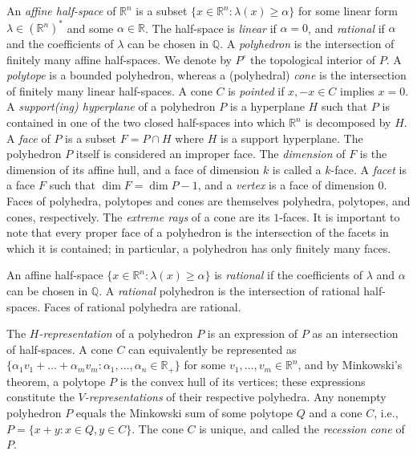 \documentclass[12pt]{amsart}
\theoremstyle{definition}
\numberwithin{equation}{section}
\newcommand{\ring}[1]{\ensuremath{\mathbb{#1}}}
\renewcommand\>{\rangle}
\newcommand\<{\langle}
\newcommand\0{\mathbf{0}}
\newcommand\QQ{\ring{Q}}
\newcommand\RR{\ring{R}}
\begin{document}
An \emph{affine half-space} of $\RR^n$ is a subset $\{x \in \RR^n: \lambda(x) \ge \alpha\}$ for some linear form $\lambda\in(\RR^n)^*$ and some $\alpha \in\RR$.  The half-space is \emph{linear} if $\alpha = 0$, and \emph{rational} if $\alpha$ and the coefficients of $\lambda$ can be chosen in $\QQ$.  A \emph{polyhedron} is the intersection of finitely many affine half-spaces.  We denote by $P^\circ$ the topological interior of $P$.  A \emph{polytope} is a bounded polyhedron, whereas a (polyhedral) \emph{cone} is the intersection of finitely many linear half-spaces. A cone $C$ is \emph{pointed} if $x,-x\in C$ implies $x = 0$. A \emph{support(ing) hyperplane} of a polyhedron $P$ is a hyperplane $H$ such that $P$ is contained in one of the two closed half-spaces into which $\RR^n$ is decomposed by $H$.  A \emph{face} of $P$ is a subset $F = P\cap H$ where $H$ is a support hyperplane.  The polyhedron $P$ itself is considered an improper face.  The \emph{dimension} of $F$ is the dimension of its affine hull, and a face of dimension $k$ is called a $k$-face. A \emph{facet} is a face $F$ such that $\dim F=\dim P-1$, and a \emph{vertex} is a face of dimension $0$. Faces of polyhedra, polytopes and cones are themselves polyhedra, polytopes, and cones, respectively. The \emph{extreme rays} of a cone are its $1$-faces. It is important to note that every proper face of a polyhedron is the intersection of the facets in which it is contained; in particular, a polyhedron has only finitely many faces.

An affine half-space $\{x \in \RR^n : \lambda(x) \ge \alpha\}$ is \emph{rational} if the coefficients of $\lambda$ and $\alpha$ can be chosen in $\QQ$. A \emph{rational} polyhedron is the intersection of rational half-spaces. Faces of rational polyhedra are rational.

The \emph{$H$-representation} of a polyhedron $P$ is an expression of $P$ as an intersection of half-spaces.  A cone $C$ can equivalently be represented as $\{\alpha_1v_1+\dots+\alpha_mv_m: \alpha_1,\dots,\alpha_n\in\RR_+ \}$ for some $v_1,\dots,v_m\in\RR^n$, and by Minkowski's theorem, a polytope $P$ is the convex hull of its vertices; these expressions constitute the \emph{$V$-representations} of their respective polyhedra.  Any nonempty polyhedron $P$ equals the Minkowski sum of some polytope $Q$ and a cone $C$, i.e., $P = \{x + y : x \in Q, y \in C\}$.  The cone $C$ is unique, and called the \emph{recession cone} of $P$.
\end{document}
